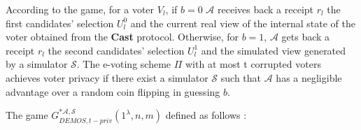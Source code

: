  According to the game, for a voter $V_l$, if $b = 0$ $\mathcal{A}$ receives back a receipt $r_l$ the first candidates' selection $U_l^0$ and the current real view of the internal state of the voter obtained from the \textbf{Cast} protocol. Otherwise, for $b = 1$,  $\mathcal{A}$ gets back a receipt $r_l$ the second candidates' selection $U_l^1$ and the simulated view generated by a simulator $\mathcal{S}$. The e-voting scheme $\Pi$ with at most t corrupted voters achieves voter privacy if there exist a simulator $\mathcal{S}$ such that $\mathcal{A}$  has a negligible advantage over a random coin flipping in guessing $b$.\\
 
\begin{definition}
The game $G_{DEMOS,t-priv}^{*\mathcal{A}, \mathcal{S}}(1^{\lambda},n,m)$ defined as follows \cite{Kiayias2015a}:\\
  

\end{definition}
